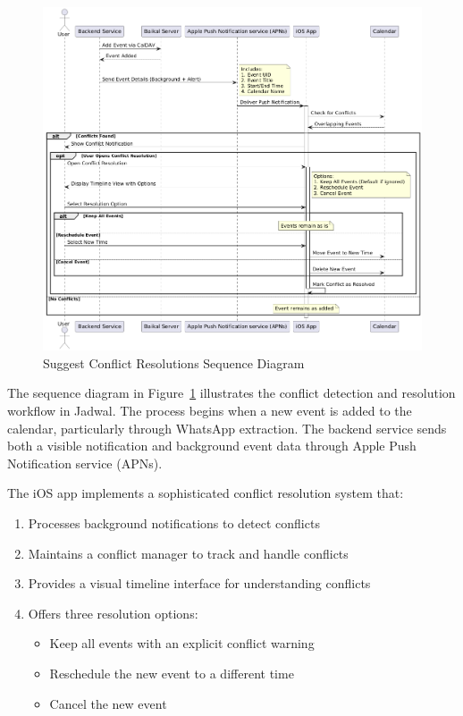 \begin{figure}[!h]
	\centering
	\includegraphics[width=\textwidth]{images/docs/diagrams/sequence-diagrams/all-sequence-diagrams/Suggest Conflict Resolutions.png}
	\caption{Suggest Conflict Resolutions Sequence Diagram}
	\label{fig:seq/suggest-conflict-resolutions}
\end{figure}

The sequence diagram in Figure~\ref{fig:seq/suggest-conflict-resolutions} illustrates the conflict detection and resolution workflow in Jadwal. The process begins when a new event is added to the calendar, particularly through WhatsApp extraction. The backend service sends both a visible notification and background event data through Apple Push Notification service (APNs).

The iOS app implements a sophisticated conflict resolution system that:
\begin{enumerate}
	\item Processes background notifications to detect conflicts
	\item Maintains a conflict manager to track and handle conflicts
	\item Provides a visual timeline interface for understanding conflicts
	\item Offers three resolution options:
	      \begin{itemize}
		      \item Keep all events with an explicit conflict warning
		      \item Reschedule the new event to a different time
		      \item Cancel the new event
	      \end{itemize}
\end{enumerate}

